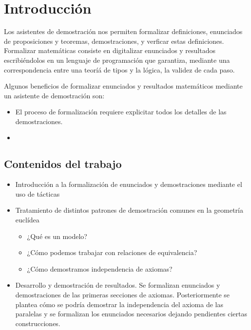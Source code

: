 
\section*{Introducción}

Los asistentes de demostración nos permiten formalizar definiciones, enunciados
de proposiciones y teoremas, demostraciones, y verficar estas definiciones.
Formalizar matemáticas consiste en digitalizar enunciados y resultados
escribiéndolos en un lenguaje de programación que garantiza, mediante una
correspondencia entre una teoríá de tipos y la lógica, la validez de cada paso.

Algunos beneficios de formalizar enunciados y resultados matemáticos mediante un
asistente de demostración son:

\begin{itemize} 

  \item El proceso de formalización requiere explicitar todos los detalles de
      las demostraciones. 

  \item 

\end{itemize}

\subsection{Contenidos del trabajo}

\begin{itemize}

    \item Introducción a la formalización de enunciados y demostraciones
        mediante el uso de tácticas

    \item Tratamiento de distintos patrones de demostración comunes en la
        geometría euclídea
        \begin{itemize}
            \item ¿Qué es un modelo?
            \item ¿Cómo podemos trabajar con relaciones de equivalencia?
            \item ¿Cómo demostramos independencia de axiomas?
        \end{itemize}

    \item Desarrollo y demostración de resultados. Se formalizan enunciados y
        demostraciones de las primeras secciones de axiomas. Posteriormente se
        plantea cómo se podría demostrar la independencia del axioma de las
        paralelas y se formalizan los enunciados necesarios dejando pendientes
        ciertas construcciones.

\end{itemize}

